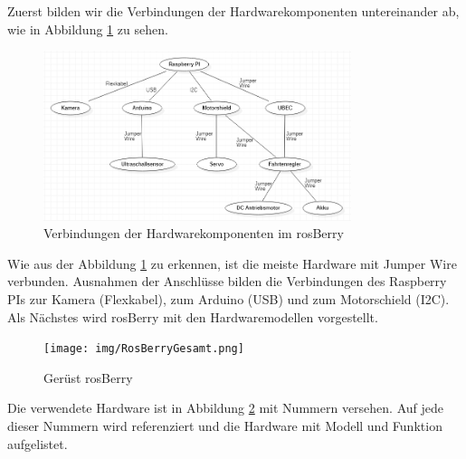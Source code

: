 \documentclass[conference]{IEEEtran}
\begin{document}
	Zuerst bilden wir die Verbindungen der Hardwarekomponenten untereinander ab, wie in Abbildung \ref{Hardwarekomponenten} zu sehen.
	
	\begin{figure}[!ht]
		\centering
		\includegraphics[width=9cm]{img/Hardwarekomponenten.PNG}
		\caption{Verbindungen der Hardwarekomponenten im rosBerry}
		\label{Hardwarekomponenten}
	\end{figure}
	
	Wie aus der Abbildung \ref{Hardwarekomponenten} zu erkennen, ist die meiste Hardware mit Jumper Wire verbunden. Ausnahmen der Anschlüsse bilden die Verbindungen des Raspberry PIs zur Kamera (Flexkabel), zum Arduino (USB) und zum Motorschield (I2C).\\
	
	Als Nächstes wird rosBerry mit den Hardwaremodellen vorgestellt.
	\\
	\begin{figure}[!ht]
		\centering
		\texttt{[image: img/RosBerryGesamt.png]}
		\caption{Gerüst rosBerry}
		\label{rosBerryGesamt}
	\end{figure}
	
	Die verwendete Hardware ist in Abbildung \ref{rosBerryGesamt} mit Nummern versehen. Auf jede dieser Nummern wird referenziert und die Hardware mit Modell und Funktion aufgelistet.
	
\end{document}
